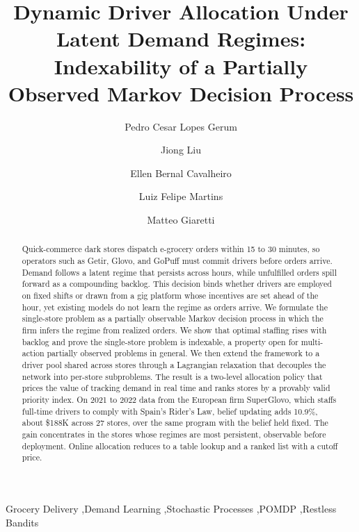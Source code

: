 \documentclass[preprint,11pt,authoryear]{elsarticle}
\theoremstyle{remark}
\begin{document}
    \begin{frontmatter}
        \title{Dynamic Driver Allocation Under Latent Demand Regimes: Indexability of a Partially Observed Markov Decision Process}
         
        \author[csu]{Pedro Cesar Lopes Gerum}
        \author[csu]{Jiong Liu}
        \author[ufms]{Ellen Bernal Cavalheiro}
        \author[csu]{Luiz Felipe Martins}
        \author[ind]{Matteo Giaretti}
        
        
          
        
\begin{abstract}

Quick-commerce dark stores dispatch e-grocery orders within 15 to 30 minutes, so operators such as Getir, Glovo, and GoPuff must commit drivers before orders arrive. Demand follows a latent regime that persists across hours, while unfulfilled orders spill forward as a compounding backlog. This decision binds whether drivers are employed on fixed shifts or drawn from a gig platform whose incentives are set ahead of the hour, yet existing models do not learn the regime as orders arrive. We formulate the single-store problem as a partially observable Markov decision process in which the firm infers the regime from realized orders. We show that optimal staffing rises with backlog and prove the single-store problem is indexable, a property open for multi-action partially observed problems in general. We then extend the framework to a driver pool shared across stores through a Lagrangian relaxation that decouples the network into per-store subproblems. The result is a two-level allocation policy that prices the value of tracking demand in real time and ranks stores by a provably valid priority index. On 2021 to 2022 data from the European firm SuperGlovo, which staffs full-time drivers to comply with Spain's Rider's Law, belief updating adds 10.9\%, about \$188K across 27 stores, over the same program with the belief held fixed. The gain concentrates in the stores whose regimes are most persistent, observable before deployment. Online allocation reduces to a table lookup and a ranked list with a cutoff price.
\end{abstract}

        \begin{keyword}
            Grocery Delivery \sep Demand Learning \sep Stochastic Processes \sep POMDP \sep Restless Bandits
        \end{keyword}
        
    \end{frontmatter}
\end{document}
